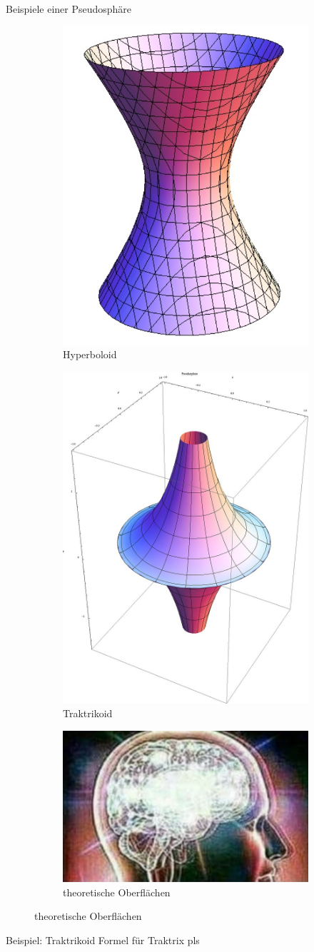\documentclass[12pt]{beamer}
\begin{document}
\begin{frame}{Beispiele einer Pseudosphäre}
\begin{figure}
\begin{subfigure}{.5\textwidth}
  \centering
  \includegraphics[width=.3\linewidth]{hyperboloid.png}
  \caption{Hyperboloid}
\end{subfigure}%
\begin{subfigure}{.5\textwidth}
  \centering
  \includegraphics[width=.3\linewidth]{pseudosphere.png}
  \caption{Traktrikoid}
\end{subfigure}
\begin{subfigure}{.5\textwidth}
  \centering
  \includegraphics[width=.3\linewidth]{theo_surface.png}
  \caption{theoretische Oberflächen}
\end{subfigure}
\end{figure}

\end{frame}

\begin{frame}{Beispiel: Traktrikoid}
Formel für Traktrix pls
\end{frame}
\end{document}
